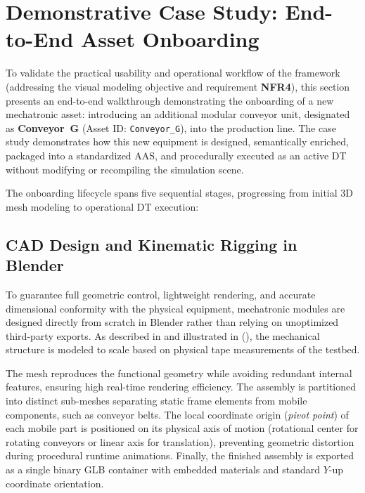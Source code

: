 \section{Demonstrative Case Study: End-to-End Asset Onboarding}
\label{sec:eval_case_study}

To validate the practical usability and operational workflow of the framework (addressing the visual modeling objective and requirement \textbf{NFR4}), this section presents an end-to-end walkthrough demonstrating the onboarding of a new mechatronic asset: introducing an additional modular conveyor unit, designated as \textbf{Conveyor~G} (Asset ID: \texttt{Conveyor\_G}), into the production line. The case study demonstrates how this new equipment is designed, semantically enriched, packaged into a standardized \gls{AAS}, and procedurally executed as an active \gls{DT} without modifying or recompiling the simulation scene.

The onboarding lifecycle spans five sequential stages, progressing from initial 3D mesh modeling to operational \gls{DT} execution:

\subsection{\texorpdfstring{\gls{CAD}}{CAD} Design and Kinematic Rigging in Blender}
To guarantee full geometric control, lightweight rendering, and accurate dimensional conformity with the physical equipment, mechatronic modules are designed directly from scratch in Blender rather than relying on unoptimized third-party exports. As described in  and illustrated in  (), the mechanical structure is modeled to scale based on physical tape measurements of the testbed. 

The mesh reproduces the functional geometry while avoiding redundant internal features, ensuring high real-time rendering efficiency. The assembly is partitioned into distinct sub-meshes separating static frame elements from mobile components, such as conveyor belts. The local coordinate origin (\textit{pivot point}) of each mobile part is positioned on its physical axis of motion (rotational center for rotating conveyors or linear axis for translation), preventing geometric distortion during procedural runtime animations. Finally, the finished assembly is exported as a single binary \gls{GLB} container with embedded materials and standard $Y$-up coordinate orientation.

